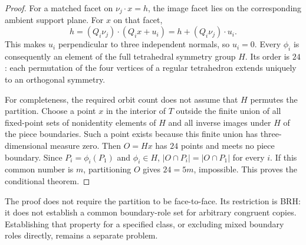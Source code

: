 \documentclass[11pt,a4paper]{article}
\theoremstyle{plain}
\theoremstyle{definition}
\theoremstyle{remark}
\begin{document}
\begin{proof}
For a matched facet on $\nu_j\cdot x=h$, the image facet lies on the
corresponding ambient support plane.  For $x$ on that facet,
\[
 h=(Q_i\nu_j)\cdot(Q_i x+u_i)=h+(Q_i\nu_j)\cdot u_i.
\]
This makes $u_i$ perpendicular to three independent normals, so $u_i=0$.
Every $\phi_i$ is consequently an element of the full tetrahedral symmetry
group $H$.  Its order is $24$: each permutation of the four vertices of a
regular tetrahedron extends uniquely to an orthogonal symmetry.

For completeness, the required orbit count does not assume that $H$ permutes
the partition.  Choose a point $x$ in the interior of $T$ outside the finite
union of all fixed-point sets of nonidentity elements of $H$ and all inverse
images under $H$ of the piece boundaries.  Such a point exists because this
finite union has three-dimensional measure zero.  Then $O=Hx$ has $24$ points and
meets no piece boundary.  Since $P_i=\phi_i(P_1)$ and $\phi_i\in H$,
$|O\cap P_i|=|O\cap P_1|$ for every $i$.  If this common number is $m$,
partitioning $O$ gives $24=5m$, impossible.  This proves the conditional
theorem.
\end{proof}

The proof does not require the partition to be face-to-face.  Its restriction
is BRH: it does not establish a common boundary-role set for arbitrary
congruent copies.  Establishing that property for a specified class, or
excluding mixed boundary roles directly, remains a separate problem.
\end{document}

